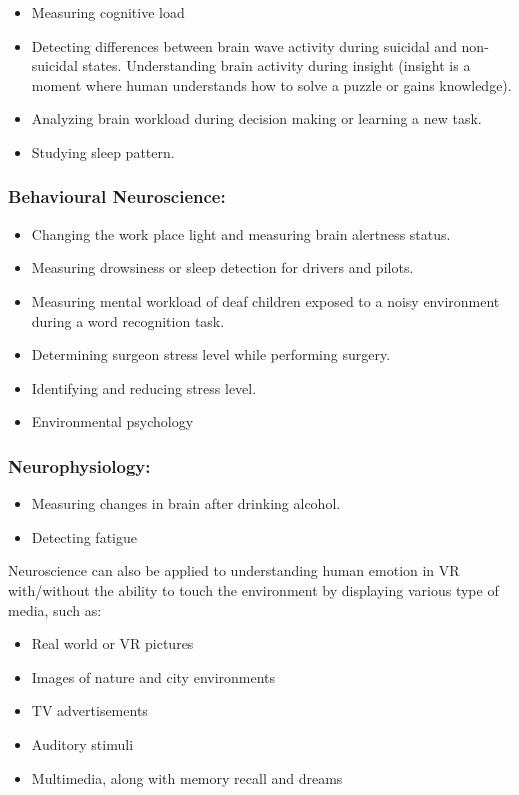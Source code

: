 \documentclass[12pt,a4paper]{article}
\begin{document}
\begin{itemize}
\item Measuring cognitive load
\item Detecting differences between brain wave activity during suicidal and non-suicidal states. Understanding brain activity during insight (insight is a moment where human understands how to solve a puzzle or gains knowledge).
\item Analyzing brain workload during decision making or learning a new task.
\item Studying sleep pattern.
\end{itemize}


\subsubsection{Behavioural Neuroscience:}

\begin{itemize}
\item Changing the work place light and measuring brain alertness status.
\item Measuring drowsiness or sleep detection for drivers and pilots.
\item Measuring mental workload of deaf children exposed to a noisy environment during a word recognition task.
\item Determining surgeon stress level while performing surgery.
\item Identifying and reducing stress level.
\item Environmental psychology
\end{itemize}


\subsubsection{Neurophysiology:}

\begin{itemize}
\item Measuring changes in brain after drinking alcohol.
\item Detecting fatigue
\end{itemize}

Neuroscience can also be applied to understanding human emotion in VR with/without the ability to touch the environment by displaying various type of media, such as:

\begin{itemize}
\item Real world or VR pictures
\item Images of nature and city environments
\item TV advertisements
\item Auditory stimuli
\item Multimedia, along with memory recall and dreams
\end{itemize}
\end{document}

